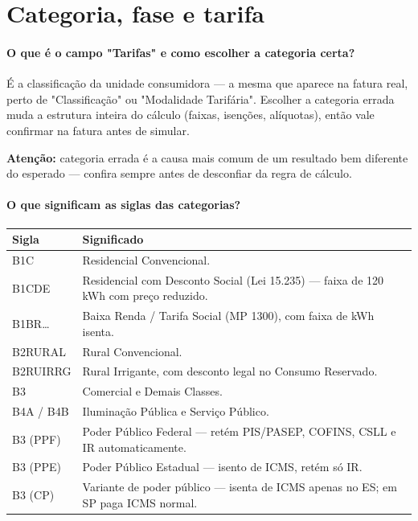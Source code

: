 \documentclass[11pt,a4paper]{article}
\begin{document}
\section{Categoria, fase e tarifa}

\paragraph{O que é o campo "Tarifas" e como escolher a categoria certa?}
É a classificação da unidade consumidora --- a mesma que aparece na fatura real, perto de "Classificação" ou "Modalidade Tarifária". Escolher a categoria errada muda a estrutura inteira do cálculo (faixas, isenções, alíquotas), então vale confirmar na fatura antes de simular.

\begin{warnbox}
\textbf{Atenção:} categoria errada é a causa mais comum de um resultado bem diferente do esperado --- confira sempre antes de desconfiar da regra de cálculo.
\end{warnbox}

\paragraph{O que significam as siglas das categorias?}
\begin{center}
\begin{tabularx}{\textwidth}{@{}l >{\raggedright\arraybackslash}X@{}}
\toprule
\textbf{Sigla} & \textbf{Significado} \\
\midrule
B1C & Residencial Convencional. \\
B1CDE & Residencial com Desconto Social (Lei 15.235) --- faixa de 120\,kWh com preço reduzido. \\
B1BR\dots & Baixa Renda / Tarifa Social (MP 1300), com faixa de kWh isenta. \\
B2RURAL & Rural Convencional. \\
B2RUIRRG & Rural Irrigante, com desconto legal no Consumo Reservado. \\
B3 & Comercial e Demais Classes. \\
B4A / B4B & Iluminação Pública e Serviço Público. \\
B3 (PPF) & Poder Público Federal --- retém PIS/PASEP, COFINS, CSLL e IR automaticamente. \\
B3 (PPE) & Poder Público Estadual --- isento de ICMS, retém só IR. \\
B3 (CP) & Variante de poder público --- isenta de ICMS apenas no ES; em SP paga ICMS normal. \\
\bottomrule
\end{tabularx}
\end{center}
\end{document}
